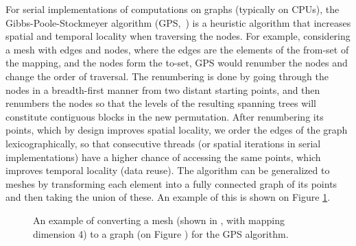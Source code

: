 \noindent For serial implementations of computations on graphs (typically on 
CPUs), the Gibbs-Poole-Stockmeyer algorithm (GPS,~\cite{gps}) is a heuristic 
algorithm that increases spatial and temporal locality when traversing the 
nodes. For example, considering a mesh with edges and nodes, where the edges are 
the elements of the from-set of the mapping, and the nodes form the to-set, GPS 
would renumber the nodes and change the order of traversal. The renumbering is 
done by going through the nodes in a breadth-first manner from two distant 
starting points, and then renumbers the nodes so that the levels of the 
resulting spanning trees will constitute contiguous blocks in the new 
permutation. After renumbering its points, which by design improves spatial 
locality, we order the edges of the graph lexicographically, so that consecutive 
threads (or spatial iterations in serial implementations) have a higher chance 
of accessing the same points, which improves temporal locality (data reuse). 
The algorithm can be generalized to meshes by transforming each element into a
fully connected graph of its points and then taking the union of these. An
example of this is shown on Figure \ref{fig:mesh2graph}.

\begin{figure}%
  \centering%
  \qquad
  \caption[]{An example of converting a mesh (shown in ,
  with mapping dimension 4) to a graph (on Figure ) for
  the GPS algorithm.}%
  \label{fig:mesh2graph}
\end{figure}

